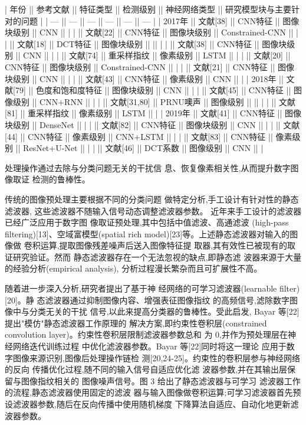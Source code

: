 \documentclass{article}
\begin{document}
| 年份    || 参考文献      || 特征类型     || 检测级别  || 神经网络类型          || 研究模型块与主要针对的问题 |
| ---   || ---       || ---      || ---   || ---             || ---           |
| 2017年 || 文献[38]    || CNN特征    || 图像块级别 || CNN             ||               |
|       || 文献[22]    || CNN特征    || 图像块级别 || Constrained-CNN ||               |
|       || 文献[18]    || DCT特征    || 图像块级别 ||                 ||               |
|       || 文献[38]    || CNN特征    || 图像块级别 || CNN             ||               |
|       || 文献[74]    || 重采样指纹    || 像素级别  || LSTM            ||               |
|       || 文献[20]    || CNN特征    || 图像块级别 || Constrained-CNN ||               |
|       || 文献[21]    || CNN特征    || 图像块级别 || CNN             ||               |
|       || 文献[43]    || CNN特征    || 像素级别  || CNN             ||               |
| 2018年 || 文献[79]    || 色度和饱和度特征 || 图像块级别 || CNN             ||               |
|       || 文献[45]    || CNN特征    || 图像级别  || CNN+RNN         ||               |
|       || 文献[31,80] || PRNU噢声   || 图像级别  ||                 ||               |
|       || 文献[81]    || 重采样指纹    || 像素级别  || LSTM            ||               |
| 2019年 || 文献[41]    || CNN特征    || 图像块级别 || DenseNet        ||               |
|       || 文献[82]    || CNN特征    || 图像块级别 || CNN             ||               |
|       || 文献[44]    || CNN特征    || 像素级别  || CNN+LSTM        ||               |
|       || 文献[83]    || CNN特征    || 像素级别  || ResNet+U-Net    ||               |
|       || 文献[46]    || DCT系数    || 图像级别  || CNN             ||               |

处理操作通过去除与分类问题无关的干扰信 息、恢复像素相关性,从而提升数字图像取证 检测的鲁棒性。

传统的图像预处理主要根据不同的分类问题 做特定分析,手工设计有针对性的静态滤波器, 这些滤波器不随输入信号动态调整滤波器参数。 近年来手工设计的滤波器已经广泛应用于数字图 像取证预处理,其中包括中值滤波、高通滤波 (high-pass filtering)[13]、空域富模型(spatial rich model)[23]等。上述静态滤波器对输入的图像做 卷积运算,提取图像残差噪声后送入图像特征提 取器,其有效性已被现有的取证研究验证。然而 静态滤波器存在一个无法忽视的缺点,即静态滤 波器来源于大量的经验分析(empirical analysis), 分析过程漫长繁杂而且可扩展性不高。

随着进一步深入分析,研究者提出了基于神 经网络的可学习滤波器(learnable filter)[20]。静 态滤波器通过抑制图像内容、增强表征图像指纹 的高频信号,滤除数字图像中与分类无关的干扰 信号,以此来提高分类器的鲁棒性。受此启发, Bayar 等[22]提出"模仿"静态滤波器工作原理的 解决方案,即约束性卷积层(constrained convolution layer)。约束性卷积层限制滤波器参数总和 为 0,并作为预处理层在神经网络迭代训练过程 中优化滤波器参数。Bayar 等[22]同时将这一理论 应用于数字图像来源识别,图像后处理操作链检 测[20,24-25]。约束性的卷积层参与神经网络的反向 传播优化过程,随不同的输入信号自适应优化滤 波器参数,并在其输出层保留与图像指纹相关的 图像噪声信号。图 3 给出了静态滤波器与可学习 滤波器工作的流程,静态滤波器使用固定的滤波 器与输入图像做卷积运算;可学习滤波器首先预 设滤波器参数,随后在反向传播中使用随机梯度 下降算法自适应、自动化地更新滤波器参数。
\end{document}
